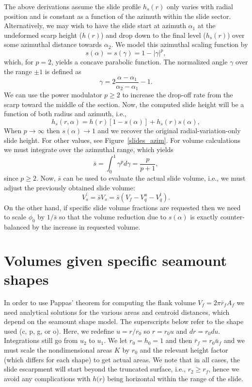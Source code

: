 \documentclass[12pt,letterpaper,margin=0.5in]{report}
\begin{document}
The above derivations assume the slide profile $h_s(r)$ only varies with radial position and is constant as a function of the azimuth within the slide sector.
Alternatively, we may wish to have the slide start at azimuth $\alpha_1$ at the undeformed scarp height ($h(r)$) and drop down to the final level ($h_s(r)$)
over some azimuthal distance towards $\alpha_2$.  We model this azimuthal scaling function by
\begin{equation}
s(\alpha) = s(\gamma) = 1 - \left |\gamma\right|^p,
\end{equation}
which, for $p = 2$, yields a concave parabolic function. The normalized angle $\gamma$ over the range $\pm1$ is defined as
\begin{equation}
\gamma = 2\frac{\alpha - \alpha_1}{\alpha_2 - \alpha_1} - 1.
\end{equation}
We can use the power modulator $p \ge 2$ to increase the drop-off rate from the scarp toward the middle of the section. Now, the computed slide height will be a function
of both radius and azimuth, i.e.,
\begin{equation}
h_s(r, \alpha) = h(r) \left [1 - s(\alpha)\right ] + h_s(r) s(\alpha),
\end{equation}
When $p \rightarrow \infty$ then $s(\alpha) \rightarrow 1$ and we recover the original radial-variation-only slide height. For other values,
see Figure~\ref{slides_azim}.
For volume calculations we must integrate over the azimuthal range, which yields
\begin{equation}
\bar{s} = \int_0^1  \gamma^p d\gamma = \frac{p}{p+1},
\end{equation}
since $p \ge 2$. Now, $\bar{s}$ can be used to evaluate the actual slide volume, i.e., we must adjust the previously obtained slide volume:
\begin{equation}
V_s^' = \bar{s} V_s = \bar{s} \left (V_f - V^u_q - V^l_q \right).
\end{equation}
On the other hand, if specific slide volume fractions are requested then we need to scale $\phi_0$ by $1/\bar{s}$ so that the
volume reduction due to $s(\alpha)$ is exactly counter-balanced by the increase in requested volume.

\section{Volumes given specific seamount shapes}

In order to use Pappas' theorem for computing the flank volume $V_f = 2 \pi \bar{r}_f A_f$ we need analytical
solutions for the various areas and centroid distances, which depend on the seamount shape model.  The
superscripts below refer to the shape used (c, p, g, or o). Here,
we redefine $u = r/r_0$ so $r = r_0 u$ and $dr = r_0 du$.  Integrations still go from $u_2$
to $u_1$.  We let $r_0 = h_0 = 1$ and then $\bar{r}_f = r_0 \bar{u}_f$ and we must scale the nondimensional areas $K$
by $r_0$ and the relevant height factor (which differs for each shape) to get actual areas. We note that
in all cases, the slide escarpment will start beyond the truncated surface, i.e., $r_2 \ge r_f$, hence we avoid
any complications with $h(r$) being horizontal within the range of the slide.
\end{document}
